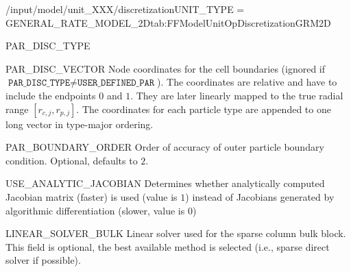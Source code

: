 \begin{condsubgroup}{/input/model/unit\_XXX/discretization}{UNIT\_TYPE = GENERAL\_RATE\_MODEL\_2D}{tab:FFModelUnitOpDiscretizationGRM2D}
\begin{dataset}[type=string,length={$1$ / \texttt{NPARTYPE}}]{PAR\_DISC\_TYPE}
  \end{dataset}
  \begin{dataset}[unit=--,type=double,range={$[0,1]$},length={$\sum_i (\texttt{NPAR}_i + 1)$}]{PAR\_DISC\_VECTOR}
    Node coordinates for the cell boundaries (ignored if $\texttt{PAR\_DISC\_TYPE} \neq \texttt{USER\_DEFINED\_PAR}$).
    The coordinates are relative and have to include the endpoints $0$ and $1$.
    They are later linearly mapped to the true radial range $[r_{c,j}, r_{p,j}]$.
    The coordinates for each particle type are appended to one long vector in type-major ordering.
  \end{dataset}
  \begin{dataset}[type=int,range={$\{ 1,2 \}$},length={1}]{PAR\_BOUNDARY\_ORDER}
    Order of accuracy of outer particle boundary condition.
    Optional, defaults to $2$.
  \end{dataset}
  \begin{dataset}[type=int,range={$\{0, 1\}$},length=1]{USE\_ANALYTIC\_JACOBIAN}
    Determines whether analytically computed Jacobian matrix (faster) is used (value is $1$) instead of Jacobians generated by algorithmic differentiation (slower, value is $0$)
  \end{dataset}
  \begin{dataset}[type=string,range={$\{\texttt{DENSE},\texttt{UMFPACK},\texttt{SUPERLU}\}$},length={1}]{LINEAR\_SOLVER\_BULK}
    Linear solver used for the sparse column bulk block.
    This field is optional, the best available method is selected (i.e., sparse direct solver if possible).


\end{dataset}
\end{condsubgroup}

